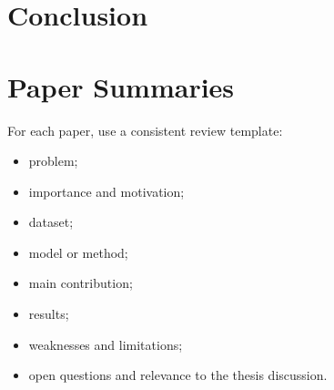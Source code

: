 \documentclass[11pt,a4paper]{article}
\begin{document}
\section{Conclusion}


\appendix

\section{Paper Summaries}

For each paper, use a consistent review template:

\begin{itemize}
    \item problem;
    \item importance and motivation;
    \item dataset;
    \item model or method;
    \item main contribution;
    \item results;
    \item weaknesses and limitations;
    \item open questions and relevance to the thesis discussion.
\end{itemize}
\end{document}
